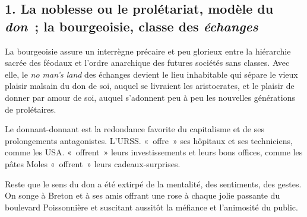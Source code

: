 \documentclass[french,twoside]{book} %
\begin{document}
\subsection[{1. La noblesse ou le prolétariat, modèle du don ; la bourgeoisie, classe des échanges}]{\textsc{1.} La noblesse ou le prolétariat, modèle du \emph{don} ; la bourgeoisie, classe des \emph{échanges}}
\noindent La bourgeoisie assure un interrègne précaire et peu glorieux entre la hiérarchie sacrée des féodaux et l’ordre anarchique des futures sociétés sans classes. Avec elle, le \emph{no man’s land} des échanges devient le lieu inhabitable qui sépare le vieux plaisir malsain du don de soi, auquel se livraient les aristocrates, et le plaisir de donner par amour de soi, auquel s’adonnent peu à peu les nouvelles générations de prolétaires.\par
Le donnant-donnant est la redondance favorite du capitalisme et de ses prolongements antagonistes. L’URSS. « offre » ses hôpitaux et ses techniciens, comme les USA. « offrent » leurs investissements et leurs bons offices, comme les pâtes Moles « offrent » leurs cadeaux-surprises.\par
Reste que le sens du don a été extirpé de la mentalité, des sentiments, des gestes. On songe à Breton et à ses amis offrant une rose à chaque jolie passante du boulevard Poissonnière et suscitant aussitôt la méfiance et l’animosité du public.\par
\end{document}
